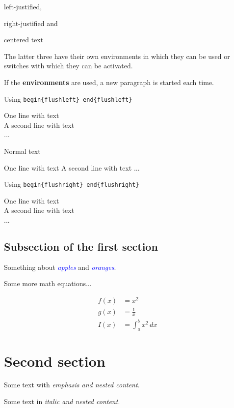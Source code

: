 \documentclass[12]{article}
\newcommand\kw[1]{\textcolor{blue}{\itshape #1}}
\begin{document}
    \textsf{left-justified},

    \textsf{right-justified} and

    \textsf{centered text}

    The latter three have their own environments in which they can be used or switches with which they can be activated.

    If the \textbf{environments} are used, a new paragraph is started each time.

    Using \verb|begin{flushleft} end{flushleft}|

    \begin{flushleft}
    One line with text \\
    A second line with text\\
    ...
    \end{flushleft}

    Normal text

    One line with text
    A second line with text
    ...

    Using \verb|begin{flushright} end{flushright}|

    \begin{flushright}
    One line with text\\
    A second line with text \\
    ...
    \end{flushright}

    \subsection{Subsection of the first section}%
    \label{subsec:first-sub-section}

    Something about \kw{apples} and \kw{oranges}.

    Some more math equations...

    \begin{align}
        f(x) &= x^2\\
        g(x) &= \frac{1}{x}\\
        I(x) &= \int_{a}^{b} x^2 \,dx
    \end{align}

    \section{Second section}%
    \label{sec:second-section}

    Some text with \emph{emphasis and \emph{nested} content}.

    Some text in \textit{italic and \textit{nested} content}.
\end{document}
